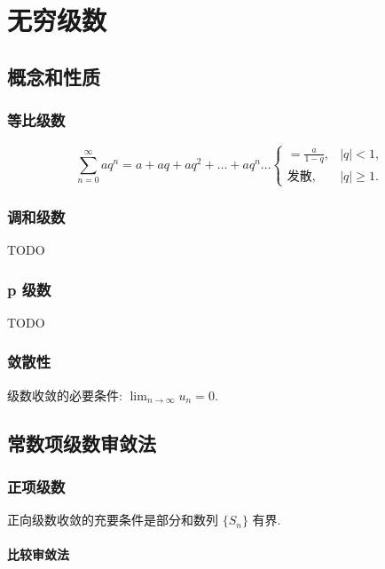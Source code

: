 \chapter{无穷级数}

\section{概念和性质}

\subsection{等比级数}

$$
    \sum_{n=0}^{\infty} aq^{n} = a + aq + aq^{2} + \dots + aq^{n} \dots
    \begin{cases}
        = \frac{a}{1-q}, & |q| < 1,    \\
        \mbox{发散},     & |q| \geq 1.
    \end{cases}
$$

\subsection{调和级数}

TODO

\subsection{p 级数}

TODO

\subsection{敛散性}

级数收敛的必要条件: $\lim_{n\to\infty} u_n = 0$.

\section{常数项级数审敛法}

\subsection{正项级数}

正向级数收敛的充要条件是部分和数列 $\{S_n\}$ 有界.

\subsubsection{比较审敛法}

